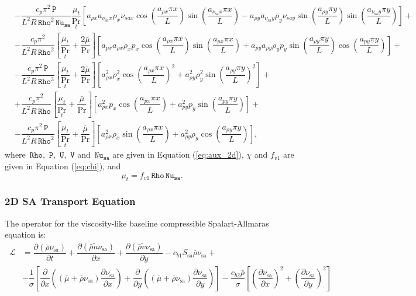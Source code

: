 \documentclass[10pt]{article}
\newcommand{\Diff}[2] {\dfrac{\partial( #1)}{\partial #2}}
\newcommand{\diff}[2] {\dfrac{\partial #1}{\partial #2}}
\newcommand{\Rho}{\,\mathtt{Rho}}
\newcommand{\PP}{\,\mathtt{P}}
\newcommand{\U}{\,\mathtt{U}}
\newcommand{\V}{\,\mathtt{V}}
\newcommand{\Nu}{\,\mathtt{Nu_{sa}}}
\newcommand{\Lo}{\,\mathcal{L}}
\newcommand{\sa}{\nu_{\mathrm{sa}}}
\newcommand{\tsa}{\mathrm{sa}}
\newcommand{\brho}{\bar{\rho}}
\newcommand{\tu}{\tilde{u}}
\newcommand{\tv}{\tilde{v}}
\newcommand{\bmu}{\bar{\mu}}
\begin{document}
\begin{equation}
\begin{split}
 &- \dfrac{c_p \pi^2 \PP}{L^2 R \Rho^2 \Nu}\dfrac{\mu_t}{\Pr_t} \left[a_{\rho x} a_{\sa x} \rho_x \nu_{sa x} \cos\left(\dfrac{a_{\rho x} \pi x}{L}\right) \sin\left(\dfrac{a_{\sa x} \pi x}{L}\right)-a_{\rho y} a_{\sa y} \rho_y \nu_{sa y} \sin\left(\dfrac{a_{\rho y} \pi y}{L}\right) \sin\left(\dfrac{a_{\sa y} \pi y}{L}\right)\right] +\\
 &-\dfrac{c_p \pi^2}{ L^2 R \Rho^2}\left[\dfrac{\mu_t}{\Pr_t}+\dfrac{2\bmu}{\Pr}\right]\left[a_{px} a_{\rho x} \rho_x p_x \cos\left(\dfrac{a_{\rho x} \pi x}{L}\right) \sin\left(\dfrac{a_{px} \pi x}{L}\right)+a_{py} a_{\rho y} \rho_y p_y \sin\left(\dfrac{a_{\rho y} \pi y}{L}\right) \cos\left(\dfrac{a_{py} \pi y}{L}\right)\right] +\\
 &-\dfrac{c_p \pi^2 \PP}{ L^2 R \Rho^3}\left[\dfrac{\mu_t}{\Pr_t}+\dfrac{2\bmu}{\Pr}\right]\left[a_{\rho x}^2 \rho_x^2 \cos\left(\dfrac{a_{\rho x} \pi x}{L}\right)^2+a_{\rho y}^2 \rho_y^2 \sin\left(\dfrac{a_{\rho y} \pi y}{L}\right)^2\right] +\\
 &+\dfrac{c_p \pi^2}{L^2 R \Rho}\left[\dfrac{\mu_t}{\Pr_t}+\dfrac{\bmu}{\Pr}\right] \left[a_{px}^2 p_x \cos\left(\dfrac{a_{px} \pi x}{L}\right)+a_{py}^2 p_y \sin\left(\dfrac{a_{py} \pi y}{L}\right)\right] +\\
%
&-\dfrac{c_p \pi^2 \PP}{L^2 R \Rho^2}\left[\dfrac{\mu_t}{\Pr_t}+\dfrac{\bmu}{\Pr}\right] \left[a_{\rho x}^2 \rho_x \sin\left(\dfrac{a_{\rho x} \pi x}{L}\right)+a_{\rho y}^2 \rho_y \cos\left(\dfrac{a_{\rho y} \pi y}{L}\right)\right],
 \end{split}
\end{equation}
where  $\Rho,\,\PP,\, \U,\,\V$ and $\Nu$ are given in Equation (\ref{eq:aux_2d}),  $\chi$ and $f_{v1}$ are given in  Equation (\ref{eq:chi}),   and  $$\mu_t= f_{v1} \Rho \Nu.$$


\subsubsection{2D SA Transport Equation}

The operator for the viscosity-like baseline compressible Spalart-Allmaras equation is:
\begin{equation*}
\begin{split}
\Lo&=  \Diff{\brho \sa }{t}+ \Diff{\brho \tu \sa }{x}+\Diff{\brho \tv \sa}{y}- c_{b1} S_\tsa \bar{\rho} \sa +\\
   &- \dfrac{1 }{\sigma}\left[\diff{}{x}\left((\bmu+\bar{\rho} \sa) \diff{\sa}{x}\right)+\diff{}{y}\left((\bmu+\bar{\rho} \sa) \diff{\sa}{y}\right)\right] -\dfrac{c_{b2} \bar{\rho} }{\sigma} \left[ \left(\diff{\sa}{x}\right)^2 + \left(\diff{\sa}{y}\right)^2\right]
\end{split}
\end{equation*}
\end{document}
